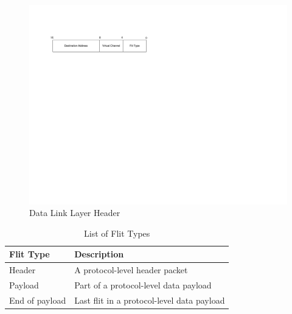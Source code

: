 \begin{figure}[ptb]
	\begin{centering}
		\includegraphics{SPI/Figures/spi-data_link_header.pdf}
		\caption{Data Link Layer Header}
		\label{fig:spi:data_link_header}
	\end{centering}
\end{figure}

\begin{table}
	\begin{center}
	\setlength{\extrarowheight}{1.5pt}
		\caption{List of Flit Types}
		\vspace{0.1cm}
		\begin{tabular}{|l|l|}
			\hline
			\textbf{Flit Type} & \textbf{Description}	\\
			\hline
			\hline
			Header	& A protocol-level header packet \\
			\hline
	       Payload	& Part of a protocol-level data payload \\
			\hline
	       End of payload	& Last flit in a protocol-level data payload \\
			\hline
		\end{tabular}
		\label{tab:spi:flit_types}
	\end{center}
\end{table}

